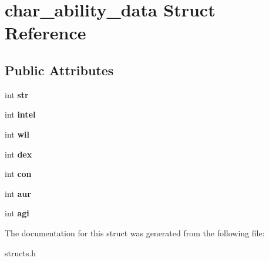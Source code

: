 \hypertarget{structchar__ability__data}{\section{char\-\_\-ability\-\_\-data Struct Reference}
\label{structchar__ability__data}
}
\subsection*{Public Attributes}
\begin{DoxyCompactItemize}
\item 
\hypertarget{structchar__ability__data_a03590f60ecee188342000a9c2480863d}{int {\bfseries str}}\label{structchar__ability__data_a03590f60ecee188342000a9c2480863d}

\item 
\hypertarget{structchar__ability__data_af63e4fce63b64c461c265e2017bfd54c}{int {\bfseries intel}}\label{structchar__ability__data_af63e4fce63b64c461c265e2017bfd54c}

\item 
\hypertarget{structchar__ability__data_a5a723a48b64cefe5b478ff8bbd20e61f}{int {\bfseries wil}}\label{structchar__ability__data_a5a723a48b64cefe5b478ff8bbd20e61f}

\item 
\hypertarget{structchar__ability__data_aa31c8cb270329610e5b8ccd5007b1836}{int {\bfseries dex}}\label{structchar__ability__data_aa31c8cb270329610e5b8ccd5007b1836}

\item 
\hypertarget{structchar__ability__data_a5b45e5f5def4987bdb429d9c9da41068}{int {\bfseries con}}\label{structchar__ability__data_a5b45e5f5def4987bdb429d9c9da41068}

\item 
\hypertarget{structchar__ability__data_aef296557583ee057d7c2a80c1e005319}{int {\bfseries aur}}\label{structchar__ability__data_aef296557583ee057d7c2a80c1e005319}

\item 
\hypertarget{structchar__ability__data_a42ade1d78f01ef212d6e652c60a0b9a8}{int {\bfseries agi}}\label{structchar__ability__data_a42ade1d78f01ef212d6e652c60a0b9a8}

\end{DoxyCompactItemize}


The documentation for this struct was generated from the following file\-:\begin{DoxyCompactItemize}
\item 
structs.\-h\end{DoxyCompactItemize}
